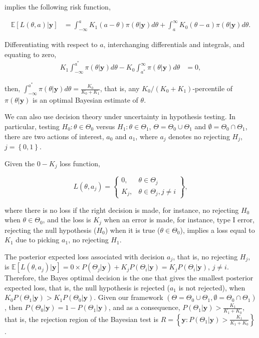 \begin{itemize}
	implies the following risk function,
	
	\begin{align*}
		\mathbb{E}[L(\theta, a)|\mathbf{y}]&=\int_{-\infty}^a K_1(a-\theta)\pi(\theta|\mathbf{y})d\theta + \int_a^{\infty} K_0(\theta-a)\pi(\theta|\mathbf{y})d\theta. 
	\end{align*}
	
	Differentiating with respect to $a$, interchanging differentials and integrals, and equating to zero,
	\begin{align*}
		K_1\int_{-\infty}^{a^*} \pi(\theta|\mathbf{y})d\theta-K_0\int_{a^*}^{\infty} \pi(\theta|\mathbf{y})d\theta&=0,
	\end{align*}
	
	then, $\int_{-\infty}^{a^*} \pi(\theta|\mathbf{y})d\theta=\frac{K_0}{K_0+K_1}$, that is, any $K_0/(K_0+K_1)$-percentile of $\pi(\theta|\mathbf{y})$ is an optimal Bayesian estimate of $\theta$. 
\end{itemize}

We can also use decision theory under uncertainty in hypothesis testing. In particular, testing $H_0:\theta\in\Theta_0$ versus $H_1:\theta\in\Theta_1$, $\Theta=\Theta_0 \cup \Theta_1$ and $\emptyset=\Theta_0 \cap \Theta_1$, there are two actions of interest, $a_0$ and $a_1$, where $a_j$ denotes no rejecting $H_j$, $j=\left\{0,1\right\}$. 

Given the $0-K_j$ loss function,

\begin{equation*}
	L(\theta,a_j)=\begin{Bmatrix} 0, & \theta\in\Theta_j\\
		K_j, & \theta\in\Theta_j, j\neq i \end{Bmatrix},
\end{equation*}

where there is no loss if the right decision is made, for instance, no rejecting $H_0$ when $\theta\in\Theta_0$, and the loss is $K_j$ when an error is made, for instance, type I error, rejecting the null hypothesis ($H_0$) when it is true ($\theta\in\Theta_0$), implies a loss equal to $K_1$ due to picking $a_1$, no rejecting $H_1$. 

The posterior expected loss associated with decision $a_j$, that is, no rejecting $H_j$, is $\mathbb{E}[L(\theta,a_j)|\mathbf{y}]=0\times P(\Theta_j|\mathbf{y}) + K_jP(\Theta_i|\mathbf{y})=K_jP(\Theta_i|\mathbf{y})$, $j\neq i$. Therefore, the Bayes optimal decision is the one that gives the smallest posterior expected loss, that is, the null hypothesis is rejected ($a_1$ is not rejected), when $K_0P(\Theta_1|\mathbf{y}) > K_1P(\Theta_0|\mathbf{y})$. Given our framework $(\Theta=\Theta_0 \cup \Theta_1, \emptyset=\Theta_0 \cap \Theta_1)$, then $P(\Theta_0|\mathbf{y})=1-P(\Theta_1|\mathbf{y})$, and as a consequence, $P(\Theta_1|\mathbf{y})>\frac{K_1}{K_1+K_0}$, that is, the rejection region of the Bayesian test is $R=\left\{\mathbf{y}:P(\Theta_1|\mathbf{y})>\frac{K_1}{K_1+K_0}\right\}$.

